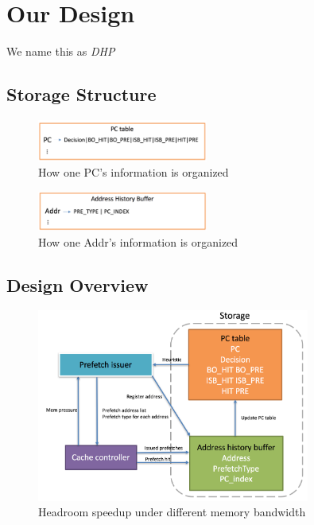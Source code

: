 \section{Our Design}
\label{sec:ourdesign}

We name this as \emph{DHP}

  \subsection{Storage Structure}
  \label{sec:storestruct}
  \begin{figure}[ht!]
	   \centering
	   \includegraphics[width=0.5\textwidth]{images/pc_table.png}
	   \caption{How one PC's information is organized}
	   \label{fig:pc_table}
  \end{figure}

  \begin{figure}[ht!]
	   \centering
	   \includegraphics[width=0.5\textwidth]{images/address_buf.png}
	   \caption{How one Addr's information is organized}
	   \label{fig:address_buf}
  \end{figure}

  \subsection{Design Overview}
  \label{sec:dynamicdesignoverview}
  \begin{figure}[ht!]
	   \centering
	   \includegraphics[width=0.8\textwidth]{images/dynamic_design.png}
	   \caption{Headroom speedup under different memory bandwidth}
	   \label{fig:dynamic_design}
  \end{figure}
